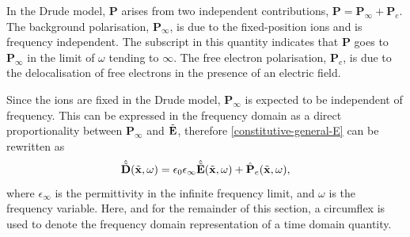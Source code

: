 In the Drude model, $\mathbf{P}$ arises from two independent contributions, $\mathbf{P} = \mathbf{P}_{\infty} + \mathbf{P}_e$. The background polarisation, $\mathbf{P}_{\infty}$, is due to the fixed-position ions and is frequency independent. The subscript in this quantity indicates that $\mathbf{P}$ goes to $\mathbf{P}_{\infty}$ in the limit of $\omega$ tending to $\infty$. The free electron polarisation, $\mathbf{P}_e$, is due to the delocalisation of free electrons in the presence of an electric field.

Since the ions are fixed in the Drude model, $\mathbf{P}_{\infty}$ is expected to be independent of frequency. This can be expressed in the frequency domain as a direct proportionality between $\mathbf{P}_{\infty}$ and $\tilde{\mathbf{E}}$, therefore \eqref{constitutive-general-E} can be rewritten as
%
\begin{equation}
\label{eq:constitutive_equations_drude_model}
\hat{\tilde{\mathbf{D}}}(\tilde{\mathbf{x}},\omega) = \epsilon_0 \epsilon_{\infty}  \hat{\tilde{\mathbf{E}}}(\tilde{\mathbf{x}}, \omega) + \hat{\mathbf{P}}_e(\tilde{\mathbf{x}},\omega) ,
\end{equation}
%
where $\epsilon_{\infty}$ is the permittivity in the infinite frequency limit, and $\omega$ is the frequency variable. Here, and for the remainder of this section, a circumflex is used to denote the frequency domain representation of a time domain quantity.

